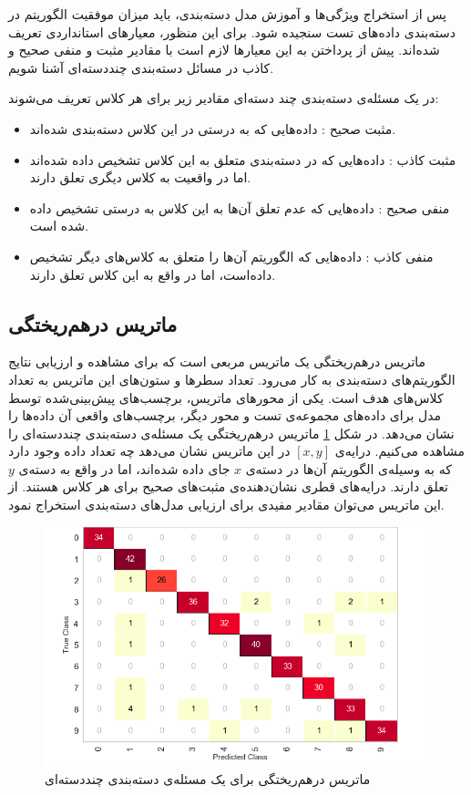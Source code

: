 پس از استخراج ویژگی‌ها و آموزش مدل دسته‌بندی، باید میزان موفقیت الگوریتم در دسته‌بندی داده‌های تست سنجیده شود. برای این منظور، معیارهای استانداردی تعریف شده‌اند. پیش از پرداختن به این معیارها لازم است با مقادیر مثبت و منفی صحیح و کاذب در مسائل دسته‌بندی چنددسته‌ای آشنا شویم.

در یک مسئله‌ی دسته‌بندی چند دسته‌ای مقادیر زیر برای هر کلاس تعریف می‌شوند:
\begin{itemize}
	\item مثبت صحیح : داده‌هایی که به درستی در این کلاس دسته‌بندی شده‌اند.
	\item مثبت کاذب : داده‌هایی که در دسته‌بندی متعلق به این کلاس تشخیص داده شده‌اند اما در واقعیت به کلاس دیگری تعلق دارند.
	\item منفی صحیح : داده‌هایی که عدم تعلق آن‌ها به این کلاس به درستی تشخیص داده شده است.
	\item منفی کاذب : داده‌هایی که الگوریتم آن‌ها را متعلق به کلاس‌های دیگر تشخیص داده‌است، اما در واقع به این کلاس تعلق دارند.
\end{itemize}

\subsection{ماتریس درهم‌ریختگی}
ماتریس درهم‌ریختگی یک ماتریس مربعی است که برای مشاهده و ارزیابی نتایج الگوریتم‌های دسته‌بندی به کار می‌رود. تعداد سطرها و ستون‌های این ماتریس به تعداد کلاس‌های هدف است. یکی از محورهای ماتریس، برچسب‌های پیش‌بینی‌شده توسط مدل برای داده‌های مجموعه‌ی تست و محور دیگر، برچسب‌های واقعی آن داده‌ها را نشان می‌دهد. در شکل \ref{fig:confusionmatrix} ماتریس درهم‌ریختگی یک مسئله‌ی دسته‌بندی چنددسته‌ای را مشاهده می‌کنیم. درایه‌ی $[x, y]$ در این ماتریس نشان می‌دهد چه تعداد داده وجود دارد که به وسیله‌ی الگوریتم آن‌ها در دسته‌ی $x$ جای داده شده‌اند، اما در واقع به دسته‌ی $y$ تعلق دارند. درایه‌های قطری نشان‌دهنده‌ی مثبت‌های صحیح برای هر کلاس هستند. از این ماتریس می‌توان مقادیر مفیدی برای ارزیابی مدل‌های دسته‌بندی استخراج نمود.

\begin{figure}[!htb]
\centering
\includegraphics[width=14cm]{Figures/confusionmatrix.png}
\caption{ ماتریس درهم‌ریختگی برای یک مسئله‌ی دسته‌بندی چنددسته‌ای \cite{Confusion}}
\label{fig:confusionmatrix}
\end{figure} 

